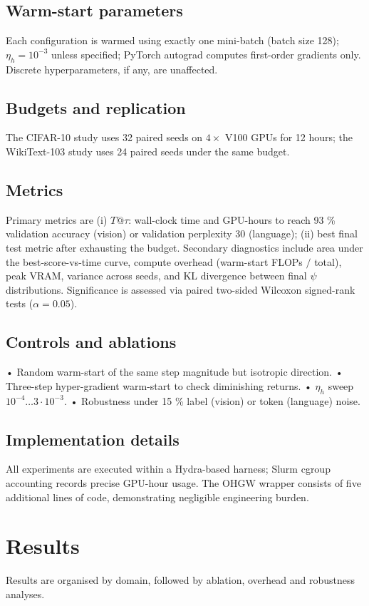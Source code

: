 \documentclass{article}
\begin{document}
\subsection{Warm-start parameters}
Each configuration is warmed using exactly one mini-batch (batch size 128); \(\eta_h = 10^{-3}\) unless specified; PyTorch autograd computes first-order gradients only. Discrete hyperparameters, if any, are unaffected.

\subsection{Budgets and replication}
The CIFAR-10 study uses 32 paired seeds on \(4 \times\) V100 GPUs for 12 hours; the WikiText-103 study uses 24 paired seeds under the same budget.

\subsection{Metrics}
Primary metrics are (i) \(T@\tau\): wall-clock time and GPU-hours to reach 93 \% validation accuracy (vision) or validation perplexity 30 (language); (ii) best final test metric after exhausting the budget. Secondary diagnostics include area under the best-score-vs-time curve, compute overhead (warm-start FLOPs \(/\) total), peak VRAM, variance across seeds, and KL divergence between final \(\psi\) distributions. Significance is assessed via paired two-sided Wilcoxon signed-rank tests (\(\alpha = 0.05\)).

\subsection{Controls and ablations}
• Random warm-start of the same step magnitude but isotropic direction. • Three-step hyper-gradient warm-start to check diminishing returns. • \(\eta_h\) sweep \(10^{-4} \ldots 3\cdot 10^{-3}\). • Robustness under 15 \% label (vision) or token (language) noise.

\subsection{Implementation details}
All experiments are executed within a Hydra-based harness; Slurm cgroup accounting records precise GPU-hour usage. The OHGW wrapper consists of five additional lines of code, demonstrating negligible engineering burden.

\section{Results}
Results are organised by domain, followed by ablation, overhead and robustness analyses.
\end{document}
